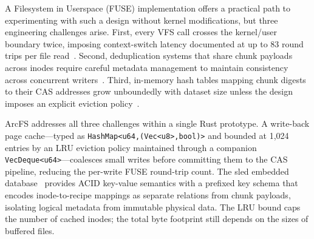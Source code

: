\documentclass[5p,times]{elsarticle}
\begin{document}
A Filesystem in Userspace (FUSE) implementation offers a practical path
to experimenting with such a design without kernel modifications, but
three engineering challenges arise. First, every VFS call crosses the
kernel/user boundary twice, imposing context-switch latency documented at
up to 83 round trips per file read~\cite{vangoor2017fuse}. Second,
deduplication systems that share chunk payloads across inodes require
careful metadata management to maintain consistency across concurrent
writers~\cite{soules2003metadata}. Third, in-memory hash tables mapping
chunk digests to their CAS addresses grow unboundedly with dataset size
unless the design imposes an explicit eviction policy~\cite{zhu2008dedup}.

ArcFS addresses all three challenges within a single Rust prototype.
A write-back page cache---typed as
\texttt{HashMap\textless{}u64,\;(Vec\textless{}u8\textgreater{},\;bool)\textgreater{}}
and bounded at 1,024 entries by an LRU eviction policy maintained through
a companion \texttt{VecDeque\textless{}u64\textgreater{}}---coalesces
small writes before committing them to the CAS pipeline, reducing the
per-write FUSE round-trip count. The sled embedded database~\cite{sled2024}
provides ACID key-value semantics with a prefixed key schema that encodes
inode-to-recipe mappings as separate relations from chunk payloads,
isolating logical metadata from immutable physical data. The LRU bound
caps the number of cached inodes; the total byte footprint still depends
on the sizes of buffered files.
\end{document}
